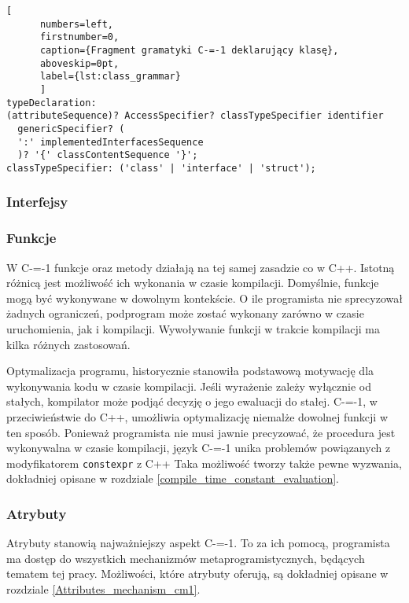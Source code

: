 \begin{minipage}{\linewidth}
  
	\begin{lstlisting}[
	  numbers=left,
	  firstnumber=0,
	  caption={Fragment gramatyki C-=-1 deklarujący klasę},
	  aboveskip=0pt,
	  label={lst:class_grammar}
	  ]
typeDeclaration:
(attributeSequence)? AccessSpecifier? classTypeSpecifier identifier 
  genericSpecifier? (
  ':' implementedInterfacesSequence
  )? '{' classContentSequence '}';
classTypeSpecifier: ('class' | 'interface' | 'struct');
  \end{lstlisting}
  \end{minipage}

\subsubsection{Interfejsy}
\subsubsection{Funkcje}
W C-=-1 funkcje oraz metody działają na tej samej zasadzie co w C++.
Istotną różnicą jest możliwość ich wykonania w czasie kompilacji.
Domyślnie, funkcje mogą być wykonywane w dowolnym kontekście.
O ile programista nie sprecyzował żadnych ograniczeń, podprogram może zostać wykonany zarówno w czasie uruchomienia, jak i kompilacji.
Wywoływanie funkcji w trakcie kompilacji ma kilka różnych zastosowań.

Optymalizacja programu, historycznie stanowiła podstawową motywację dla wykonywania kodu w czasie kompilacji.
Jeśli wyrażenie zależy wyłącznie od stałych, kompilator może podjąć decyzję o jego ewaluacji do stałej.
C-=-1, w przeciwieństwie do C++, umożliwia optymalizację niemalże dowolnej funkcji w ten sposób.
Ponieważ programista nie musi jawnie precyzować, że procedura jest wykonywalna w czasie kompilacji, język C-=-1 unika problemów powiązanych z modyfikatorem \lstinline{constexpr} z C++ \cite{Klimiankou:contexpr_great_good_wrong_idea}
Taka możliwość tworzy także pewne wyzwania, dokładniej opisane w rozdziale \ref{compile_time_constant_evaluation}.

\subsubsection{Atrybuty}
\label{Attributes_definition}

Atrybuty stanowią najważniejszy aspekt C-=-1.
To za ich pomocą, programista ma dostęp do wszystkich mechanizmów metaprogramistycznych, będących tematem tej pracy.
Możliwości, które atrybuty oferują, są dokładniej opisane w rozdziale \ref{Attributes_mechanism_cm1}.

